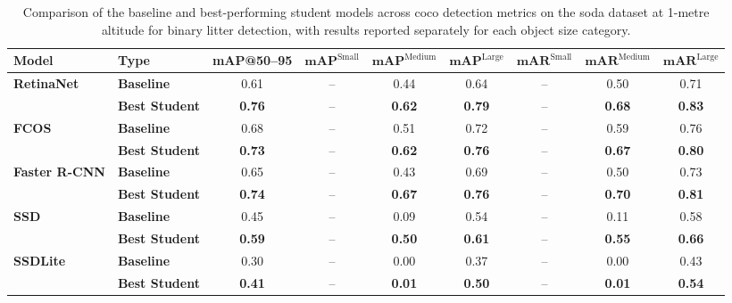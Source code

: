 \begin{table*}[htbp]
\centering
\renewcommand{\arraystretch}{1.35} %
\begin{adjustbox}{width=\textwidth}
\begin{tabular}{llccccccc}
\hline
\textbf{Model} & \textbf{Type} & \textbf{mAP@50--95} & \(\mathbf{mAP}^{\text{Small}}\) & \(\mathbf{mAP}^{\text{Medium}}\) & \(\mathbf{mAP}^{\text{Large}}\) & \(\mathbf{mAR}^{\text{Small}}\) & \(\mathbf{mAR}^{\text{Medium}}\) & \(\mathbf{mAR}^{\text{Large}}\) \\ \hline
\multirow{2}{*}{\textbf{RetinaNet}} 
 & \textbf{Baseline}      & 0.61 & --    & 0.44 & 0.64 & --    & 0.50 & 0.71 \\
 & \textbf{Best Student}  & \textbf{0.76} & --    & \textbf{0.62} & \textbf{0.79} & --    & \textbf{0.68} & \textbf{0.83} \\ \hline
\multirow{2}{*}{\textbf{FCOS}} 
 & \textbf{Baseline}      & 0.68 & --    & 0.51 & 0.72 & --    & 0.59 & 0.76 \\
 & \textbf{Best Student}  & \textbf{0.73} & --    & \textbf{0.62} & \textbf{0.76} & --    & \textbf{0.67} & \textbf{0.80} \\ \hline
\multirow{2}{*}{\textbf{Faster R-CNN}} 
 & \textbf{Baseline}      & 0.65 & --    & 0.43 & 0.69 & --    & 0.50 & 0.73 \\
 & \textbf{Best Student}  & \textbf{0.74} & --    & \textbf{0.67} & \textbf{0.76} & --    & \textbf{0.70} & \textbf{0.81} \\ \hline
\multirow{2}{*}{\textbf{SSD}} 
 & \textbf{Baseline}      & 0.45 & --    & 0.09 & 0.54 & --    & 0.11 & 0.58 \\
 & \textbf{Best Student}  & \textbf{0.59} & --    & \textbf{0.50} & \textbf{0.61} & --    & \textbf{0.55} & \textbf{0.66} \\ \hline
\multirow{2}{*}{\textbf{SSDLite}} 
 & \textbf{Baseline}      & 0.30 & --    & 0.00 & 0.37 & --    & 0.00 & 0.43 \\
 & \textbf{Best Student}  & \textbf{0.41} & --    & \textbf{0.01} & \textbf{0.50} & --    & \textbf{0.01} & \textbf{0.54} \\ \hline
\end{tabular}
\end{adjustbox}
\caption{Comparison of the baseline and best‐performing student models across \gls{coco} detection metrics on the \gls{soda} dataset at 1-metre altitude for binary litter detection, with results reported separately for each object size category.}
\label{tab:soda01m_object_sizes_split}
\end{table*}

